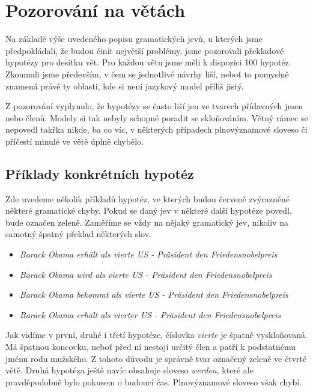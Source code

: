 \documentclass[12pt,a4paper]{report}
\begin{document}
\section{Pozorování na větách}
Na základě výše uvedeného popisu gramatických jevů, u kterých jsme předpokládali, že budou činit největší problémy, jsme pozorovali překladové hypotézy pro desítku vět. Pro každou větu jsme měli k dispozici 100 hypotéz. Zkoumali jsme především, v čem se jednotlivé návrhy liší, neboť to pomyslně znamená právě ty oblasti, kde si není jazykový model příliš jistý.

Z pozorování vyplynulo, že hypotézy se často liší jen ve tvarech přídavných jmen nebo členů. Modely si tak nebyly schopné poradit se skloňováním. Větný rámec se nepovedl takřka nikde, ba co víc, v některých případech plnovýznamové sloveso či příčestí minulé ve větě úplně chybělo.

\subsection{Příklady konkrétních hypotéz}

Zde uvedeme několik příkladů hypotéz, ve kterých budou {\color{red}červeně} zvýrazněné některé gramatické chyby. Pokud se daný jev v některé další hypotéze povedl, bude označen {\color{OliveGreen}zeleně}. Zaměříme se vždy na nějaký gramatický jev, nikoliv na samotný špatný překlad některých slov.

\begin{itemize}
\item{\textit{Barack Obama erhält als {\color{red}vierte US - Präsident} den Friedensnobelpreis}}
\item{\textit{Barack Obama {\color{red}wird} als {\color{red}vierte US - Präsident} den Friedensnobelpreis}}
\item{\textit{Barack Obama bekommt als {\color{red}vierte US - Präsident} den Friedensnobelpreis}}
\item{\textit{Barack Obama erhält als {\color{OliveGreen}vierter US - Präsident} den Friedensnobelpreis}}
\end{itemize}

Jak vidíme v první, druhé i třetí hypotéze, číslovka \textit{vierte} je špatně vyskloňovaná. Má špatnou koncovku, neboť před ní nestojí určitý člen a patří k podstatnému jménu rodu mužského. Z tohoto důvodu je správně tvar označený zeleně ve čtvrté větě. Druhá hypotéza ještě navíc obsahuje sloveso \textit{werden}, které ale pravděpodobně bylo pokusem o budoucí čas. Plnovýznamové sloveso však chybí.
\end{document}
